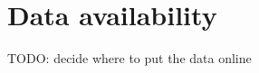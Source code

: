 \documentclass[10pt,a4paper,twocolumn]{article}
\begin{document}
\title{}



\maketitle
\thispagestyle{fancy}

\begin{abstract}

\end{abstract}
\clearpage







\section*{Data availability}

TODO: decide where to put the data online










{\small
}
\end{document}
